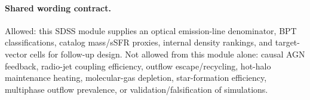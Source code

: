 \documentclass[twocolumn]{aastex631}
\begin{document}
\paragraph{Shared wording contract.}
Allowed: this SDSS module supplies an optical emission-line denominator, BPT classifications, catalog mass/sSFR proxies, internal density rankings, and target-vector cells for follow-up design. Not allowed from this module alone: causal AGN feedback, radio-jet coupling efficiency, outflow escape/recycling, hot-halo maintenance heating, molecular-gas depletion, star-formation efficiency, multiphase outflow prevalence, or validation/falsification of simulations.
\end{document}
